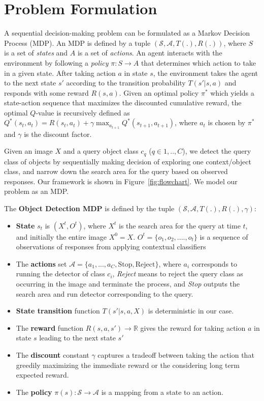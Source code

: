 \section{Problem Formulation}
A sequential decision-making problem can be formulated as a Markov Decision
Process (MDP).
An MDP is defined by a tuple $(\mathcal{S}, \mathcal{A}, T(.), R(.))$,
where $S$ is a set of \textit{states} and $A$ is a set of
\textit{actions}. An agent interacts with the
environment by following a
\textit{policy} $\pi: S \rightarrow A$ that determines which action to take in a
given state. After taking action $a$ in
state $s$, the environment takes the
agent to the next state $s'$ according to the transition probability $T(s'|s,a)$
and responds with some reward $R(s,a)$.
Given an optimal policy $\pi^\ast$ which yields a state-action sequence that maximizes the discounted cumulative reward,
the optimal $Q$-value is recursively defined as $Q^\ast(s_t, a_t) = R(s_t, a_t) + \gamma\max_{a_{t+1}}Q^\ast(s_{t+1}, a_{t+1})$, where $a_t$ is chosen by $\pi^\ast$ and $\gamma$ is the discount factor.

Given an image $X$ and a query object class $c_q$ ($q \in {1,..,C}$),
we detect the query class of objects by sequentially making decision of exploring one context/object class, and narrow down the search area for the query based on observed responses. Our framework is shown in Figure~\ref{fig:flowchart}.
We model our problem as an MDP.

\begin{mydef}
The \textbf{Object Detection MDP} is defined by the tuple $(\mathcal{S}, \mathcal{A}, T(.), R(.), \gamma)$:
\begin{itemize}
\item \textbf{State} $s_t$ is $(X^t, O^t)$, where  $X^t$ is the search area for the query at time $t$, and initially the entire image $X^0 = X$. $O^t= \{o_1, o_2, ....,o_t\}$ is a sequence of observations of responses from applying contextual classifiers
\item The \textbf{actions} set $\mathcal{A} = \{a_1, ..., a_C, \mbox{Stop}, \mbox{Reject}\} $, where $a_i$ corresponds to running the detector of class $c_i$, \textit{Reject} means to reject the query class as occurring in the image and terminate the process, and \textit{Stop} outputs the search area and run detector corresponding to the query.
\item \textbf{State transition} function $T(s'|s,a, X)$ is deterministic in our case.
\item The \textbf{reward} function $R(s,a,s') \rightarrow \mathbb{R}$ gives the reward for taking action $a$ in state $s$ leading to the next state $s'$
\item The \textbf{discount} constant $\gamma$ captures a tradeoff between taking the action that greedily maximizing the immediate reward or the considering long term expected reward.
\item The \textbf{policy} $\pi(s): \mathcal{S} \rightarrow \mathcal{A}$ is a mapping from a state to an action.
\end{itemize}
\end{mydef}

